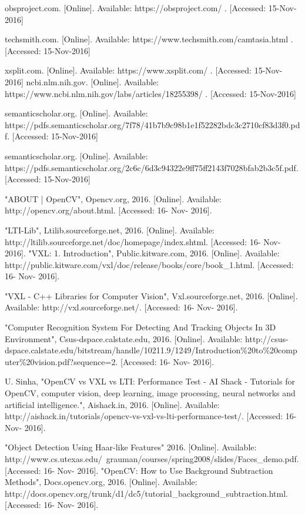 \documentclass[onecolumn, draftclsnofoot,10pt, compsoc]{IEEEtran}
\begin{document}
\begin{thebibliography}{99}
obsproject.com. [Online]. Available: https://obsproject.com/ . [Accessed: 15-Nov-2016] 

techsmith.com. [Online]. Available: https://www.techsmith.com/camtasia.html . [Accessed: 15-Nov-2016]

xsplit.com. [Online]. Available: https://www.xsplit.com/ . [Accessed: 15-Nov-2016]
 ncbi.nlm.nih.gov. [Online]. Available: https://www.ncbi.nlm.nih.gov/labs/articles/18255398/ . [Accessed: 15-Nov-2016]

semanticscholar.org. [Online]. Available: https://pdfs.semanticscholar.org/7f78/41b7b9c98b1e1f52282bdc3c2710cf83d3f0.pdf. [Accessed: 15-Nov-2016]

 semanticscholar.org. [Online]. Available: https://pdfs.semanticscholar.org/2c6c/6d3c94322e9ff75ff2143f7028bfab2b3c5f.pdf. [Accessed: 15-Nov-2016]

"ABOUT | OpenCV", Opencv.org, 2016. [Online]. Available: http://opencv.org/about.html. [Accessed: 16- Nov- 2016].

"LTI-Lib", Ltilib.sourceforge.net, 2016. [Online]. Available: http://ltilib.sourceforge.net/doc/homepage/index.shtml. [Accessed: 16- Nov- 2016].
"VXL: 1. Introduction", Public.kitware.com, 2016. [Online]. Available: http://public.kitware.com/vxl/doc/release/books/core/book\_1.html. [Accessed: 16- Nov- 2016].

"VXL - C++ Libraries for Computer Vision", Vxl.sourceforge.net, 2016. [Online]. Available: http://vxl.sourceforge.net/. [Accessed: 16- Nov- 2016].

"Computer Recognition System For Detecting And Tracking Objects In 3D Environment", Csus-dspace.calstate.edu, 2016. [Online]. Available: http://csus-dspace.calstate.edu/bitstream/handle/10211.9/1249/Introduction\%20to\%20computer\%20vision.pdf?sequence=2. [Accessed: 16- Nov- 2016].

U. Sinha, "OpenCV vs VXL vs LTI: Performance Test - AI Shack - Tutorials for OpenCV, computer vision, deep learning, image processing, neural networks and artificial intelligence.", Aishack.in, 2016. [Online]. Available: http://aishack.in/tutorials/opencv-vs-vxl-vs-lti-performance-test/. [Accessed: 16- Nov- 2016].

"Object Detection Using Haar-like Features" 2016. [Online]. Available: http://www.cs.utexas.edu/~grauman/courses/spring2008/slides/Faces\_demo.pdf. [Accessed: 16- Nov- 2016].
"OpenCV: How to Use Background Subtraction Methods", Docs.opencv.org, 2016. [Online]. Available: http://docs.opencv.org/trunk/d1/dc5/tutorial\_background\_subtraction.html. [Accessed: 16- Nov- 2016].


\end{thebibliography}
\end{document}
